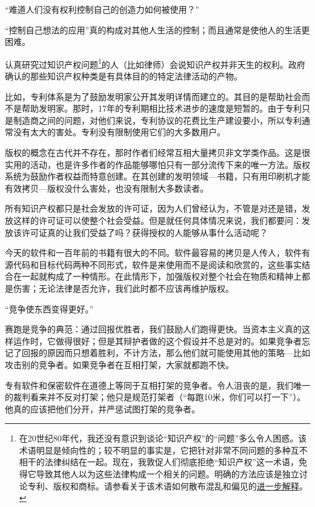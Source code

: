 \textsf{“难道人们没有权利控制自己的创造力如何被使用？”}\par
“控制自己想法的应用”真的构成对其他人生活的控制；而且通常是使他人的生活更困难。\par
认真研究过知识产权问题\footnote{在20世纪80年代，我还没有意识到谈论“知识产权”的“问题”多么令人困惑。该术语明显是倾向性的；较不明显的事实是，它把针对非常不同问题的多种互不相干的法律纠结在一起。现在，我敦促人们彻底拒绝“知识产权”这一术语，免得它导致其他人以为这些法律构成一个相关的问题。明确的方法应该是独立讨论专利、版权和商标。请参看关于该术语如何散布混乱和偏见的\href{http://www.gnu.org/philosophy/not-ipr.html}{进一步解释}。}的人（比如律师）会说知识产权并非天生的权利。政府确认的那些知识产权种类是有具体目的的特定法律活动的产物。\par
比如，专利体系是为了鼓励发明家公开其发明详情而建立的。其目的是帮助社会而不是帮助发明家。那时，17年的专利期相比技术进步的速度是短暂的。由于专利只是制造商之间的问题，对他们来说，专利协议的花费比生产建设要小，所以专利通常没有太大的害处。专利没有限制使用它们的大多数用户。\par
版权的概念在古代并不存在，那时作者们经常互相大量拷贝非文学类作品。这是很实用的活动，也是许多作者的作品能够哪怕只有一部分流传下来的唯一方法。版权系统为鼓励作者权益而特意创建。在其创建的发明领域—书籍，只有用印刷机才能有效拷贝—版权没什么害处，也没有限制大多数读者。\par
所有知识产权都只是社会发放的许可证，因为人们曾经认为，不管是对还是错，发放这样的许可证可以使整个社会受益。但是就任何具体情况来说，我们都要问：发放该许可证真的让我们受益了吗？获得授权的人能够从事什么活动呢？\par
今天的软件和一百年前的书籍有很大的不同。软件最容易的拷贝是人传人，软件有源代码和目标代码两种不同形式，软件是来使用而不是阅读和欣赏的，这些事实结合在一起就构成了一种情形。在此情形下，加强版权对整个社会在物质和精神上都是伤害；无论法律是否允许，我们此时都不应该再维护版权。\par
\textsf{“竞争使东西变得更好。”}\par
赛跑是竞争的典范：通过回报优胜者，我们鼓励人们跑得更快。当资本主义真的这样运作时，它做得很好；但是其辩护者做的这个假设并不总是对的。如果竞争者忘记了回报的原因而只想着胜利，不计方法，那么他们就可能使用其他的策略—比如攻击别的竞争者。如果竞争者在互相打架，大家就都跑不快。\par
专有软件和保密软件在道德上等同于互相打架的竞争者。令人沮丧的是，我们唯一的裁判看来并不反对打架；他只是规范打架者（“每跑10米，你们可以打一下”）。他真的应该把他们分开，并严惩试图打架的竞争者。\par
